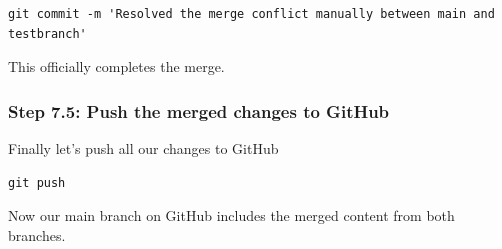 \documentclass[
  11pt,
  a4paper,
]{article}
\begin{document}
\begin{verbatim}
git commit -m 'Resolved the merge conflict manually between main and testbranch'
\end{verbatim}

This officially completes the merge.

\subsubsection{Step 7.5: Push the merged changes to
GitHub}\label{step-7.5-push-the-merged-changes-to-github}

Finally let's push all our changes to GitHub

\begin{verbatim}
git push
\end{verbatim}

Now our main branch on GitHub includes the merged content from both
branches.
\end{document}
